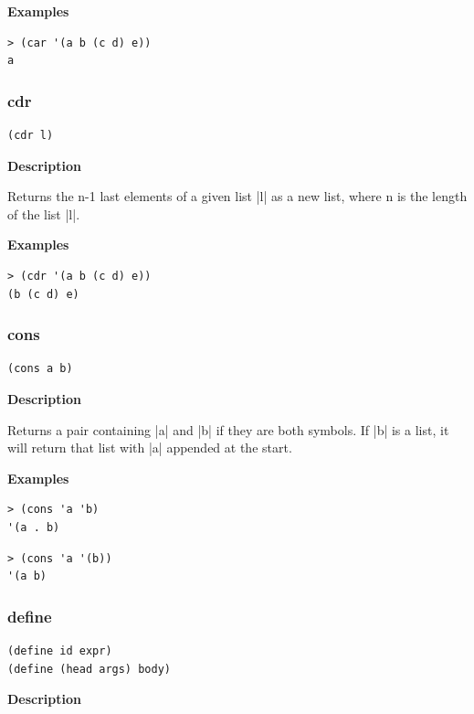\documentclass[a4paper]{article}
\begin{document}
\textbf{Examples}

\begin{lstlisting}
> (car '(a b (c d) e))
a
\end{lstlisting}

\subsubsection{cdr}

\begin{lstlisting}[frame=none]
(cdr l)
\end{lstlisting}

\textbf{Description}

Returns the n-1 last elements of a given list |l| as a new list, where n is the length of the list |l|.

\textbf{Examples}

\begin{lstlisting}
> (cdr '(a b (c d) e))
(b (c d) e)
\end{lstlisting}

\subsubsection{cons}

\begin{lstlisting}[frame=none]
(cons a b)
\end{lstlisting}

\textbf{Description}

Returns a pair containing |a| and |b| if they are both symbols. If |b| is a list, it will return that list with |a| appended at the start.

\textbf{Examples}

\begin{lstlisting}
> (cons 'a 'b)
'(a . b)
\end{lstlisting}

\begin{lstlisting}
> (cons 'a '(b))
'(a b)
\end{lstlisting}

\subsubsection{define}

\begin{lstlisting}[frame=none]
(define id expr)
(define (head args) body)
\end{lstlisting}

\textbf{Description}
\end{document}
